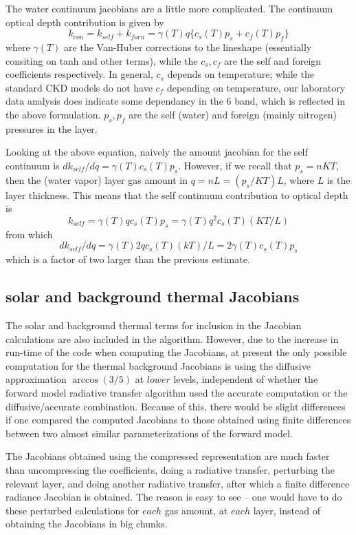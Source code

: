 \documentclass[12pt]{article}
\begin{document}
{{{{The water continuum jacobians are a little more complicated. The continuum
optical depth contribution is given by 
\[
k_{con} = k_{self} + k_{forn} = \gamma(T) q \{ c_{s}(T)p_{s} + c_{f}(T)p_{f} \}
\]
where $\gamma(T)$ are the Van-Huber corrections to the lineshape (essentially
consiting on tanh and other terms), while the $c_{s},c_{f}$ are the self
and foreign coefficients respectively. In general, $c_{s}$ depends on 
temperature; while the standard CKD models do not have $c_{f}$ depending on
temperature, our laboratory data analysis does indicate some dependancy in the
6 \um band, which is reflected in the above formulation. $p_{s},p_{f}$  are 
the self (water) and foreign (mainly nitrogen) pressures in the layer.

Looking at the above equation, naively the amount jacobian for the self 
continuum is $dk_{self}/dq = \gamma(T)c_{s}(T)p_{s}$. However, if we recall
that $p_{s} = n K T$, then the (water vapor) layer gas amount in 
$q = nL = (p_{s}/KT) L$, where $L$ is the layer thickness. This means that the 
self continuum contribution to optical depth is 
\[
k_{self} = \gamma(T) q c_{s}(T) p_{s}  = \gamma(T) q^2 c_{s}(T) (KT/L)
\]
from which  
\[
dk_{self}/dq = \gamma(T) 2q c_{s}(T) (kT)/L = 2 \gamma(T) c_{s}(T)p_{s}
\]
which is a factor of two larger than the previous estimate.

\subsection{solar and background thermal Jacobians}
The solar and background thermal terms for inclusion in the Jacobian
calculations are also included in the algorithm.  However, due to the
increase in run-time of the code when computing the Jacobians, at
present the only possible computation for the thermal background
Jacobians is using the diffusive approximation $\arccos(3/5)$ at
$lower$ levels, independent of whether the forward model radiative
transfer algorithm used the accurate computation or the
diffusive/accurate combination.  Because of this, there would be
slight differences if one compared the computed Jacobians to those
obtained using finite differences between two almost similar
parameterizations of the forward model.

The Jacobians obtained using the compressed representation are much
faster than uncompressing the coefficients, doing a radiative
transfer, perturbing the relevant layer, and doing another radiative
transfer, after which a finite difference radiance Jacobian is
obtained.  The reason is easy to see -- one would have to do these
perturbed calculations for $each$ gas amount, at $each$ layer, instead
of obtaining the Jacobians in big chunks.

}}}}
\end{document}
